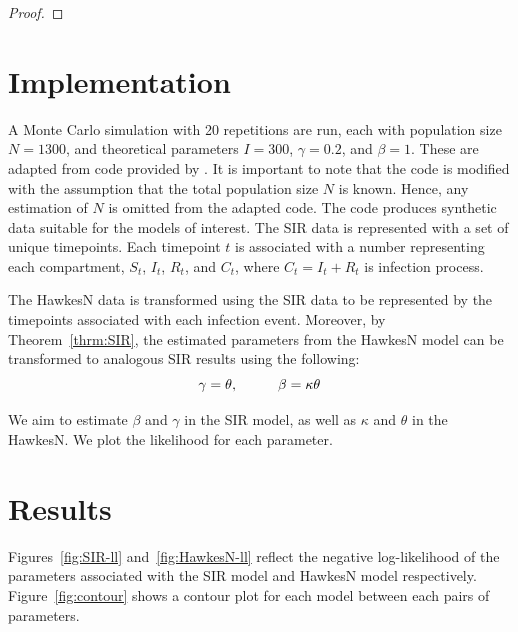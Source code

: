 \documentclass[12pt]{article}
\begin{document}
\begin{proof}

\end{proof}






\section{Implementation}

A Monte Carlo simulation with 20 repetitions are run, each with population size $N = 1300$, and theoretical parameters $I = 300$, $\gamma = 0.2$, and $\beta = 1$. These are adapted from code provided by \citep{Rizoiu2018}.  It is important to note that the code is modified with the assumption that the total population size $N$ is known. Hence, any estimation of $N$ is omitted from the adapted code. The code produces synthetic data suitable for the models of interest. The SIR data is represented with a set of unique timepoints. Each timepoint $t$ is associated with a number representing each compartment, $S_t$, $I_t$, $R_t$, and $C_t$, where $C_t = I_t + R_t$ is infection process. 
 
The HawkesN data is transformed using the SIR data to be represented by the timepoints associated with each infection event. Moreover, by Theorem~\ref{thrm:SIR}, the estimated parameters from the HawkesN model can be transformed to analogous SIR results using the following:
\[
\gamma = \theta, \hspace{10mm}
\beta = \kappa \theta
\]

We aim to estimate $\beta$ and $\gamma$ in the SIR model, as well as $\kappa$ and $\theta$ in the HawkesN. We plot the likelihood for each parameter. 




\section{Results}

Figures~\ref{fig:SIR-ll} and~\ref{fig:HawkesN-ll} reflect the negative log-likelihood of the parameters associated with the SIR model and HawkesN model respectively. Figure~\ref{fig:contour} shows a contour plot for each model between each pairs of parameters. 
\end{document}
